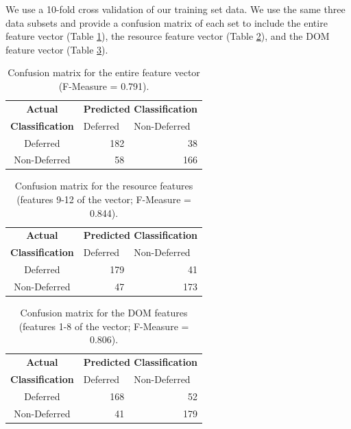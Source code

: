 \documentclass{ipres_proc_article-sp}
\begin{document}
We use a 10-fold cross validation of our training set data. We use the same three data subsets and provide a confusion matrix of each set to include the entire feature vector (Table \ref{cmAll}), the resource feature vector (Table \ref{cmResource}), and the DOM feature vector (Table \ref{cmDOM}).

\begin{table}
\centering\begin{tabular}{cll}
\textbf{Actual} & \multicolumn{2}{c}{ \textbf{Predicted Classification}}                           \\
\textbf{Classification}   &          Deferred       &           Non-Deferred             \\ \cline{2-3} 
       Deferred           & \multicolumn{1}{|r}{182} & \multicolumn{1}{|r|}{38} \\ \cline{2-3} 
       Non-Deferred       & \multicolumn{1}{|r}{58} & \multicolumn{1}{|r|}{166} \\ \cline{2-3} 
\end{tabular}
 \caption{Confusion matrix for the entire feature vector (F-Measure = 0.791).}
  \label{cmAll}
\end{table}

\begin{table}
\centering\begin{tabular}{cll}
\textbf{Actual} & \multicolumn{2}{c}{ \textbf{Predicted Classification}}                           \\
\textbf{Classification}   &          Deferred       &           Non-Deferred             \\ \cline{2-3} 
       Deferred           & \multicolumn{1}{|r}{179} & \multicolumn{1}{|r|}{41} \\ \cline{2-3} 
       Non-Deferred       & \multicolumn{1}{|r}{47} & \multicolumn{1}{|r|}{173} \\ \cline{2-3} 
\end{tabular}
 \caption{Confusion matrix for the resource features (features 9-12 of the vector; F-Measure = 0.844).}
  \label{cmResource}
\end{table}

\begin{table}
\centering\begin{tabular}{cll}
\textbf{Actual} & \multicolumn{2}{c}{ \textbf{Predicted Classification}}                           \\
\textbf{Classification}   &          Deferred       &           Non-Deferred             \\ \cline{2-3} 
       Deferred           & \multicolumn{1}{|r}{168} & \multicolumn{1}{|r|}{52} \\ \cline{2-3} 
       Non-Deferred       & \multicolumn{1}{|r}{41} & \multicolumn{1}{|r|}{179} \\ \cline{2-3} 
\end{tabular}
 \caption{Confusion matrix for the DOM features (features 1-8 of the vector; F-Measure = 0.806).}
  \label{cmDOM}
\end{table}
\end{document}
